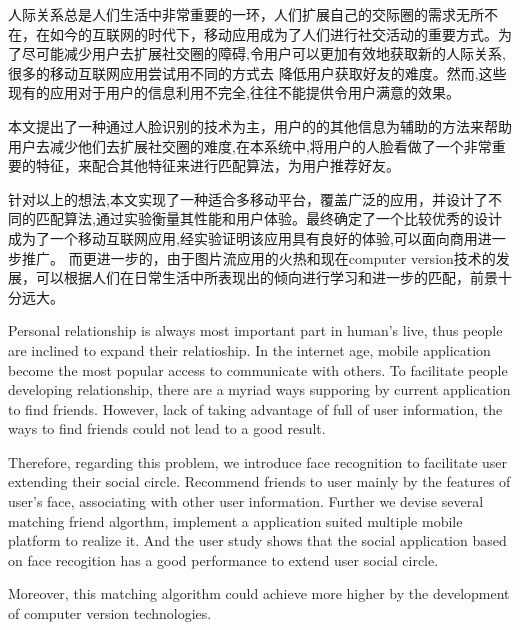 
\begin{cabstract}
	人际关系总是人们生活中非常重要的一环，⼈们扩展自己的交际圈的需求⽆所不在，在如今的互联网的时代下，移动应用成为了人们进行社交活动的重要方式。为了尽可能减少用户去扩展社交圈的障碍,令⽤户可以更加有效地获取新的人际关系,很多的移动互联⽹应用尝试用不同的方式去 降低用户获取好友的难度。然⽽,这些现有的应用对于用户的信息利用不完全,往往不能提供令用户满意的效果。

	本⽂提出了⼀种通过人脸识别的技术为主，用户的的其他信息为辅助的方法来帮助用户去减少他们去扩展社交圈的难度,在本系统中,将用户的人脸看做了一个非常重要的特征，来配合其他特征来进行匹配算法，为用户推荐好友。 

针对以上的想法,本⽂实现了一种适合多移动平台，覆盖广泛的应用，并设计了不同的匹配算法,通过实验衡量其性能和用户体验。最终确定了一个比较优秀的设计 成为了一个移动互联⽹应⽤,经实验证明该应用具有良好的体验,可以面向商⽤进⼀步推⼴。
而更进一步的，由于图片流应用的火热和现在computer version技术的发展，可以根据人们在日常生活中所表现出的倾向进行学习和进一步的匹配，前景十分远大。


\end{cabstract}

\begin{eabstract}
	Personal relationship is always most important part in human's live, thus people are inclined to expand their relatioship. In the internet age, mobile application become the most popular access to communicate with others. To facilitate people developing relationship, there are a myriad ways supporing by current application to find friends. 
	However, lack of taking advantage of full of user information, the ways to find friends could not lead to a good result.

	Therefore, regarding this problem, we introduce face recognition to facilitate user extending their social circle. Recommend friends to user mainly by the features of user's face, associating with other user information. Further we devise several matching friend algorthm, implement a application suited multiple mobile platform to realize it. And the user study shows that the social application based on face recogition has a good performance to extend user social circle. 

	Moreover, this matching algorithm could achieve more higher by the development of computer version technologies.   
\end{eabstract}

